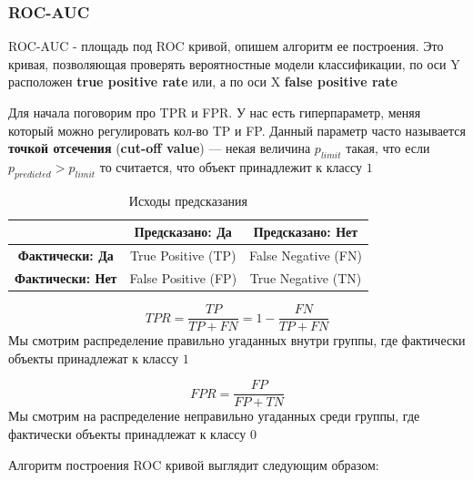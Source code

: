 \documentclass{article}
\begin{document}
    \subsubsection{ROC-AUC}

    ROC-AUC - площадь под ROC кривой, опишем алгоритм ее построения. 
    Это кривая, позволяющая проверять вероятностные модели классификации, по оси Y расположен \textbf{true positive rate} или, 
    а по оси X \textbf{false positive rate}

    Для начала поговорим про TPR и FPR. У нас есть гиперпараметр, меняя который можно регулировать кол-во TP и FP.
    Данный параметр часто называется \textbf{точкой отсечения} (\textbf{cut-off value}) --- некая величина
    $p_{limit}$ такая, что если $p_{predicted} > p_{limit}$ то считается, что объект принадлежит к классу $1$

    \quad

    \begin{table}[h] %
        \centering %
        \caption{Исходы предсказания} %
        \begin{tabular}{|c|c|c|}
            \hline
            & \textbf{Предсказано: Да} & \textbf{Предсказано: Нет} \\ \hline
            \textbf{Фактически: Да} & True Positive (TP) & False Negative (FN) \\ \hline
            \textbf{Фактически: Нет} & False Positive (FP) & True Negative (TN) \\ \hline
        \end{tabular}
    \end{table}

    \begin{equation}
        TPR = \dfrac{TP}{TP + FN} = 1 - \dfrac{FN}{TP + FN}
    \end{equation}
    Мы смотрим распределение правильно угаданных внутри группы, где фактически объекты принадлежат к классу $1$

    \begin{equation}
        FPR = \dfrac{FP}{FP + TN}
    \end{equation}
    Мы смотрим на распределение неправильно угаданных среди группы, где фактически объекты принадлежат к классу $0$

    \quad 

    Алгоритм построения ROC кривой выглядит следующим образом: 
\end{document}
